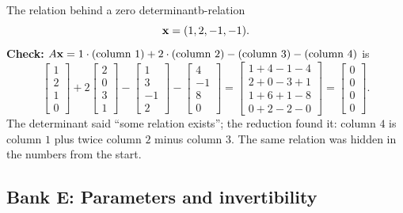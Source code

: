 \documentclass[11pt]{article}
\begin{document}
\begin{exmp}{The relation behind a zero determinant}{b-relation}
\[
\mathbf{x}=(1,2,-1,-1).
\]
\textbf{Check:} $A\mathbf{x}=1\cdot\text{(column }1)+2\cdot\text{(column }2)-\text{(column }3)-\text{(column }4)$ is
\[
\begin{bmatrix}1\\2\\1\\0\end{bmatrix}+2\begin{bmatrix}2\\0\\3\\1\end{bmatrix}-\begin{bmatrix}1\\3\\-1\\2\end{bmatrix}-\begin{bmatrix}4\\-1\\8\\0\end{bmatrix}=\begin{bmatrix}1+4-1-4\\2+0-3+1\\1+6+1-8\\0+2-2-0\end{bmatrix}=\begin{bmatrix}0\\0\\0\\0\end{bmatrix}.
\]
The determinant said ``some relation exists''; the reduction found it: column $4$ is column $1$ plus twice column $2$ minus column $3$. The same relation was hidden in the numbers from the start.
\end{exmp}

\subsection*{Bank E: Parameters and invertibility}
\end{document}
